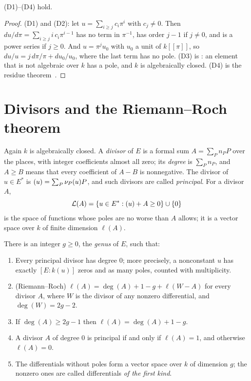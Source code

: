 \begin{theorem}\label{thm:differentials}
\textup{(D1)}--\textup{(D4)} hold.
\end{theorem}

\begin{proof}
(D1) and (D2): let $u = \sum_{i \ge j} c_i \pi^i$ with $c_j \ne 0$. Then
$du/d\pi = \sum_{i \ge j} i\, c_i \pi^{i-1}$ has no term in $\pi^{-1}$, has
order $j - 1$ if $j \ne 0$, and is a power series if $j \ge 0$. And $u = \pi^j
u_0$ with $u_0$ a unit of $k[[\pi]]$, so $du/u = j\, d\pi/\pi + du_0/u_0$,
where the last term has no pole. (D3) is
\cite[Corollaries~1.1.20 and~1.3.4]{stichtenoth2009}: an element that is
not algebraic over $k$ has a pole, and $k$ is algebraically closed. (D4) is
the residue theorem~\cite[Corollary~4.3.3]{stichtenoth2009}.
\end{proof}

\section{Divisors and the Riemann--Roch theorem}\label{sec:ff-rr}

Again $k$ is algebraically closed. A \emph{divisor} of $E$ is a formal sum $A
= \sum_P n_P P$ over the places, with integer coefficients almost all zero;
its \emph{degree} is $\sum_P n_P$, and $A \ge B$ means that every coefficient
of $A - B$ is nonnegative. The divisor of $u \in E^*$ is $(u) = \sum_P
\nu_{P}(u) P$, and such divisors are called \emph{principal}. For a divisor
$A$,
\[
  \mathcal{L}(A) = \{ u \in E^* : (u) + A \ge 0 \} \cup \{0\}
\]
is the space of functions whose poles are no worse than $A$ allows; it is a
vector space over $k$ of finite dimension $\ell(A)$.

\begin{theorem}\label{thm:riemann-roch}
There is an integer $g \ge 0$, the \emph{genus} of $E$, such that:
\begin{enumerate}[label=\textup{(\roman*)}]
\item Every principal divisor has degree $0$; more precisely, a nonconstant
  $u$ has exactly $[E : k(u)]$ zeros and as many poles, counted with
  multiplicity.
\item \textup{(Riemann--Roch)} $\ell(A) = \deg(A) + 1 - g + \ell(W - A)$ for
  every divisor $A$, where $W$ is the divisor of any nonzero differential,
  and $\deg(W) = 2g - 2$.
\item If $\deg(A) \ge 2g - 1$ then $\ell(A) = \deg(A) + 1 - g$.
\item A divisor $A$ of degree $0$ is principal if and only if $\ell(A) = 1$,
  and otherwise $\ell(A) = 0$.
\item The differentials without poles form a vector space over $k$ of
  dimension $g$; the nonzero ones are called differentials \emph{of the first
  kind}.
\end{enumerate}
\end{theorem}

